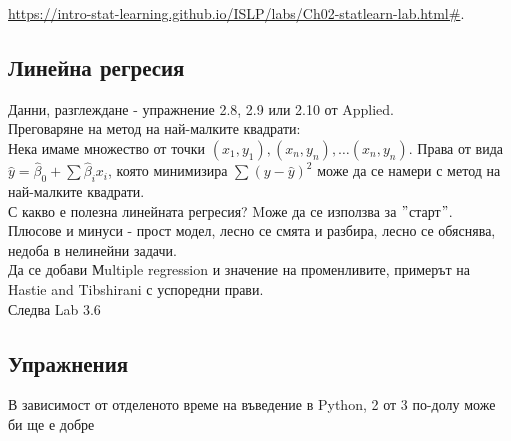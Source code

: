 \documentclass{article}
\begin{document}
 	\href{https://intro-stat-learning.github.io/ISLP/labs/Ch02-statlearn-lab.html#}{https://intro-stat-learning.github.io/ISLP/labs/Ch02-statlearn-lab.html\#}.
 	
	\subsection{Линейна регресия}
	Данни, разглеждане - упражнение 2.8, 2.9 или 2.10 от Applied. \\
	
	Преговаряне на метод на най-малките квадрати: \\
	Нека имаме множество от точки $(x_1,y_1), (x_n,y_n), \dots (x_n,y_n)$. 
	Права от вида $\hat y = \hat \beta_0 + \sum \hat \beta_i  x_i $, която минимизира $\sum (y-\hat{y})^2$  може да се намери с метод на най-малките квадрати. \\
	С какво е полезна линейната регресия? Mоже да се използва за $"$старт$"$.\\
	Плюсове и минуси - прост модел, лесно се смята и разбира, лесно се обяснява, недоба в нелинейни задачи. \\
	
	Да се добави Мultiple regression и значение на променливите, примерът на Hastie and Tibshirani с успоредни прави. \\
	
	Следва Lab 3.6 
	\subsection{Упражнения}
	В зависимост от отделеното време на въведение в Python,
	2 от 3 по-долу може би ще е добре
	
\end{document}
